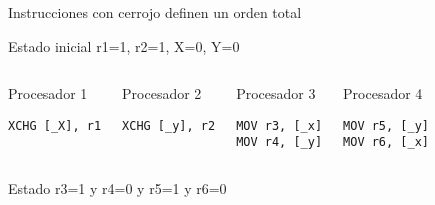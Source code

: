 \begin{frame}[t,fragile]{Instrucciones con cerrojo definen un orden total}

\begin{block}{Estado inicial}
r1=1, r2=1, X=0, Y=0
\end{block}


\begin{columns}[T]


\begin{block}{\small Procesador 1}
\begin{lstlisting}[language={[x86masm]Assembler}]
XCHG [_X], r1
\end{lstlisting}
\end{block}

\begin{block}{\small Procesador 2}
\begin{lstlisting}[language={[x86masm]Assembler}]
XCHG [_y], r2
\end{lstlisting}
\end{block}

\begin{block}{\small Procesador 3}
\begin{lstlisting}[language={[x86masm]Assembler}]
MOV r3, [_x]
MOV r4, [_y]
\end{lstlisting}
\end{block}

\begin{block}{\small Procesador 4}
\begin{lstlisting}[language={[x86masm]Assembler}]
MOV r5, [_y]
MOV r6, [_x]
\end{lstlisting}
\end{block}

\end{columns}


\begin{block}{Estado }
r3=1 y r4=0 y r5=1 y r6=0
\end{block}

\end{frame}


